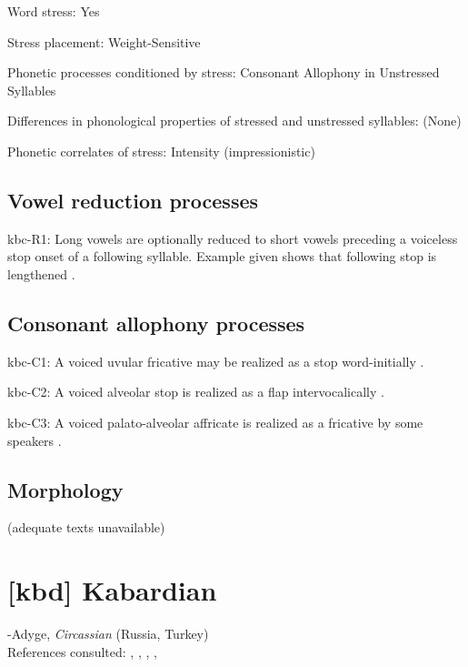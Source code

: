{\begin{appendixdesc}
\item[Word stress:] Yes

\item[Stress placement:] Weight-Sensitive

\item[Phonetic processes conditioned by stress:] Consonant Allophony in Unstressed Syllables

\item[Differences in phonological properties of stressed and unstressed syllables:] (None)

\item[Phonetic correlates of stress:] Intensity (impressionistic)
\end{appendixdesc}
\subsection*{Vowel reduction processes}
\begin{appendixdesc}

\item[kbc-R1:] Long vowels are optionally reduced to short vowels preceding a voiceless stop onset of a following syllable. Example given shows that following stop is lengthened \citep[17]{Sandalo1997}.
\end{appendixdesc}
\subsection*{Consonant allophony processes}
\begin{appendixdesc}

\item[kbc-C1:] A voiced uvular fricative may be realized as a stop word-initially \citep[16]{Sandalo1997}.

\item[kbc-C2:] A voiced alveolar stop is realized as a flap intervocalically \citep[16]{Sandalo1997}.

\item[kbc-C3:] A voiced palato-alveolar affricate is realized as a fricative by some speakers \citep[15--16]{Sandalo1997}.
\end{appendixdesc}
\subsection*{Morphology}

(adequate texts unavailable)

\section*{[kbd] Kabardian}  %
-Adyge, \textit{Circassian} (Russia, Turkey)\medskip\\
References consulted: \citet{Applebaum2013}, \citet{Colarusso2006}, \citet{GordonApplebaum2010}, \citet{Kuipers1960}, \citet{Matasović2010}

}
